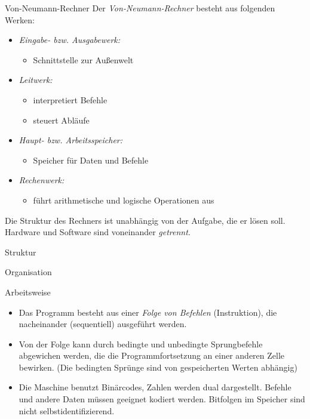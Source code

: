 \begin{defi}{Von-Neumann-Rechner}
    Der \emph{Von-Neumann-Rechner} besteht aus folgenden Werken:
    \begin{itemize}
        \item \emph{Eingabe- bzw. Ausgabewerk:}
        \begin{itemize}
            \item Schnittstelle zur Außenwelt
        \end{itemize}
        \item \emph{Leitwerk:}
        \begin{itemize}
            \item interpretiert Befehle
            \item steuert Abläufe
        \end{itemize}
        \item \emph{Haupt- bzw. Arbeitsspeicher:}
        \begin{itemize}
            \item Speicher für Daten und Befehle
        \end{itemize}
        \item \emph{Rechenwerk:}
        \begin{itemize}
            \item führt arithmetische und logische Operationen aus
        \end{itemize}
    \end{itemize}

    Die Struktur des Rechners ist unabhängig von der Aufgabe, die er lösen soll.
    Hardware und Software sind voneinander \emph{getrennt}.
\end{defi}

\begin{defi}{Struktur}

\end{defi}

\begin{defi}{Organisation}

\end{defi}

\begin{defi}{Arbeitsweise}
    \begin{itemize}
        \item Das Programm besteht aus einer \emph{Folge von Befehlen} (Instruktion),
        die nacheinander (sequentiell) ausgeführt werden.
        \item Von der Folge kann durch bedingte und unbedingte Sprungbefehle abgewichen werden, die die Programmfortsetzung an einer anderen Zelle bewirken.
        (Die bedingten Sprünge sind von gespeicherten Werten abhängig)
        \item Die Maschine benutzt Binärcodes, Zahlen werden dual dargestellt.
        Befehle und andere Daten müssen geeignet kodiert werden.
        Bitfolgen im Speicher sind nicht selbstidentifizierend.
    \end{itemize}
\end{defi}

